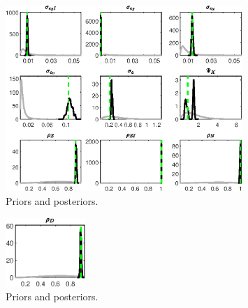  
\begin{figure}[H]
\centering
\includegraphics[width=0.80\textwidth]{BRS_extended_fd/Output/BRS_extended_fd_PriorsAndPosteriors1}
\caption{Priors and posteriors.}\label{Fig:PriorsAndPosteriors:1}
\end{figure}
 
\begin{figure}[H]
\centering
\includegraphics[width=0.27\textwidth]{BRS_extended_fd/Output/BRS_extended_fd_PriorsAndPosteriors2}
\caption{Priors and posteriors.}\label{Fig:PriorsAndPosteriors:2}
\end{figure}
 
